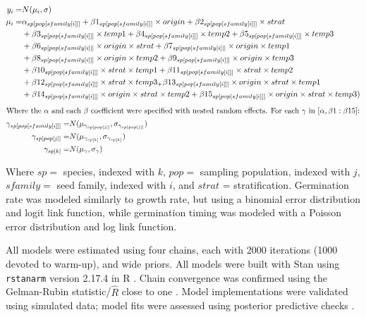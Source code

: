 \documentclass[12pt]{article}\usepackage[]{graphicx}\usepackage[]{color}
\begin{document}
\begin{align}
y_i =&  N(\mu_i,\sigma)\\
  \mu_i =&  \alpha_{sp[pop[sfamily[i]]]} + \beta 1_{sp[pop[sfamily[i]]]}\times origin +  \beta 2_{sp[pop[sfamily[i]]]} \times strat\\
          & +\beta 3_{sp[pop[sfamily[i]]]}\times temp1 +  \beta 4_{sp[pop[sfamily[i]]]}\times temp2 + \beta 5_{sp[pop[sfamily[i]]]}\times temp3 \notag \\
          & 
 		 + \beta 6_{sp[pop[sfamily[i]]]}\times origin\times strat  + \beta 7_{sp[pop[sfamily[i]]]}\times origin \times temp1 \notag\\ &
 		 + \beta 8_{sp[pop[sfamily[i]]]}\times origin \times temp2 + \beta 9_{sp[pop[sfamily[i]]]}\times origin \times temp3 \notag \\ &
 		 +\beta 10_{sp[pop[sfamily[i]]]}\times strat\times temp1 +\beta 11_{sp[pop[sfamily[i]]]}\times strat \times temp2 \notag \\ &
 		 + \beta 12_{sp[pop[sfamily[i]]]}\times strat \times temp3_ + \beta 13_{sp[pop[sfamily[i]]]}\times origin \times strat \times temp1 \notag\\ &
 		 +\beta 14_{sp[pop[sfamily[i]]]}\times origin \times strat \times temp2 + \beta 15_{sp[pop[sfamily[i]]]}\times origin \times strat \times temp3 )\notag
 \end{align}
 \begin{align}
 		 \intertext{Where the $\alpha$ and each $\beta$ coefficient were specified with nested random effects. For each $\gamma$ in $[\alpha,\beta 1:\beta 15]$:}
 		 \gamma_{sp[pop[sfamily[i]]]} =& N(\mu_{\gamma_{sp[pop[j]]}}, \sigma_{\gamma_{sp[pop[j]]}}) \\
 		 \gamma_{sp[pop[j]]} = & N(\mu_{\gamma_{sp[k]}}, \sigma_{\gamma_{sp[k]}}) \\
 		 \gamma_{sp[k]} = & N(\mu_{\gamma}, \sigma_{\gamma})
\end{align}


	 Where $sp = $ species, indexed with $k$, $pop =$ sampling population, indexed with $j$, $sfamily =$ seed family, indexed with $i$, and $strat$ = stratification. Germination rate was modeled similarly to growth rate, but using a binomial error distribution and logit link function, while germination timing was modeled with a Poisson error distribution and log link function. 
	 	
	All models were estimated using four chains, each with 2000 iterations (1000 devoted to warm-up), and wide priors. All models were built with Stan \parencite{Carpenter2017} using \texttt{rstanarm} version 2.17.4 \parencite{Goodrich2018} in R \parencite{Team2015}. Chain convergence was confirmed using the Gelman-Rubin statistic/$\hat{R}$ close to one \parencite{Gelman1992}. Model implementations were validated using simulated data; model fits were assessed using posterior predictive checks \parencite{Gelman2004}.  
	
\end{document}
